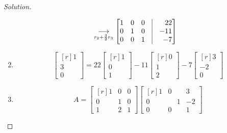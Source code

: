 \documentclass{article}
\theoremstyle{mystyle}
\begin{document}
\begin{proof}[Solution]
\begin{enumerate}
\begin{align*}
        &\underset{r_{2}+\frac{3}{2}r_{3}}{\longrightarrow} \begin{bmatrix*}[r] 1 & 0 & 0 & \vline & 22 \\ 0 & 1 & 0 & \vline & -11 \\ 0 & 0 & 1 & \vline & -7 \end{bmatrix*}
    \end{align*}
    \item
    \begin{equation*}
        \begin{bmatrix*}[r] 1 \\ 3 \\ 0 \end{bmatrix*} = 22 \begin{bmatrix*}[r] 1 \\ 0 \\ 1 \end{bmatrix*} - 11\begin{bmatrix*}[r] 0 \\ 1 \\ 2 \end{bmatrix*} -7 \begin{bmatrix*}[r] 3 \\ -2 \\ 0 \end{bmatrix*}
    \end{equation*}
    \item
    \begin{equation*}
        A = \begin{bmatrix*}[r] 1 & 0 & 0 \\ 0 & 1 & 0 \\ 1 & 2 & 1 \end{bmatrix*} \begin{bmatrix*}[r] 1 & 0 & 3 \\ 0 & \phantom{-}1 & -2 \\ 0 & 0 & 1 \end{bmatrix*}
    \end{equation*}
\end{enumerate}
\end{proof} 
\end{document}
